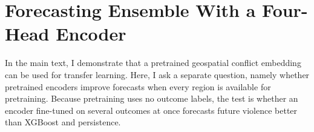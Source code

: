 \documentclass[11pt, letterpaper]{article}
\begin{document}




\section{Forecasting Ensemble With a Four-Head Encoder}
\label{app:forecast_ensemble}
\label{app:ensemble}
In the main text, I demonstrate that a pretrained geospatial conflict embedding can be used for transfer learning. Here, I ask a separate question, namely whether pretrained encoders improve forecasts when every region is available for pretraining. Because pretraining uses no outcome labels, the test is whether an encoder fine-tuned on several outcomes at once forecasts future violence better than XGBoost and persistence.
\end{document}
